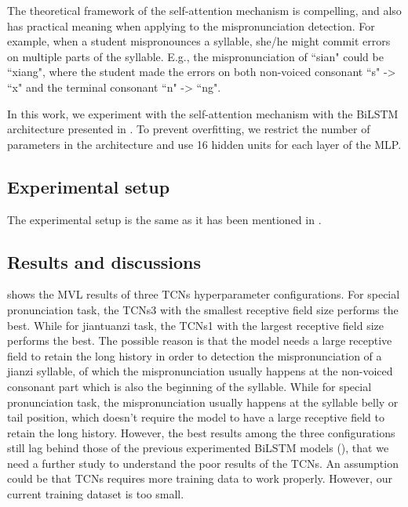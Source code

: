 The theoretical framework of the self-attention mechanism is compelling, and also has practical meaning when applying to the mispronunciation detection. For example, when a student mispronounces a syllable, she/he might commit errors on multiple parts of the syllable. E.g., the mispronunciation of ``sian" could be ``xiang", where the student made the errors on both non-voiced consonant ``s" -> ``x" and the terminal consonant ``n" -> ``ng".

In this work, we experiment with the self-attention mechanism with the BiLSTM architecture presented in . To prevent overfitting, we restrict the number of parameters in the architecture and use 16 hidden units for each layer of the MLP.

\subsection{Experimental setup}

The experimental setup is the same as it has been mentioned in .

\subsection{Results and discussions}

 shows the MVL results of three TCNs hyperparameter configurations. For special pronunciation task, the TCNs3 with the smallest receptive field size performs the best. While for jiantuanzi task, the TCNs1 with the largest receptive field size performs the best. The possible reason is that the model needs a large receptive field to retain the long history in order to detection the mispronunciation of a jianzi syllable, of which the mispronunciation usually happens at the non-voiced consonant part which is also the beginning of the syllable. While for special pronunciation task, the mispronunciation usually happens at the syllable belly or tail position, which doesn't require the model to have a large receptive field to retain the long history. However, the best results among the three configurations still lag behind those of the previous experimented BiLSTM models (), that we need a further study to understand the poor results of the TCNs. An assumption could be that TCNs requires more training data to work properly. However, our current training dataset is too small.

